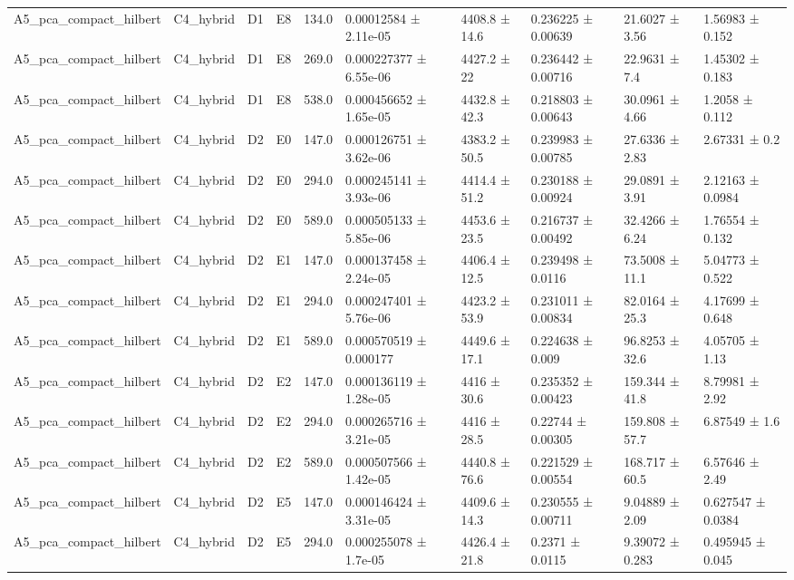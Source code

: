 \begin{table}
\begin{tabular}{llllllllll}
A5\_pca\_compact\_hilbert & C4\_hybrid & D1 & E8 & 134.0 & 0.00012584 ± 2.11e-05 & 4408.8 ± 14.6 & 0.236225 ± 0.00639 & 21.6027 ± 3.56 & 1.56983 ± 0.152 \\
A5\_pca\_compact\_hilbert & C4\_hybrid & D1 & E8 & 269.0 & 0.000227377 ± 6.55e-06 & 4427.2 ± 22 & 0.236442 ± 0.00716 & 22.9631 ± 7.4 & 1.45302 ± 0.183 \\
A5\_pca\_compact\_hilbert & C4\_hybrid & D1 & E8 & 538.0 & 0.000456652 ± 1.65e-05 & 4432.8 ± 42.3 & 0.218803 ± 0.00643 & 30.0961 ± 4.66 & 1.2058 ± 0.112 \\
A5\_pca\_compact\_hilbert & C4\_hybrid & D2 & E0 & 147.0 & 0.000126751 ± 3.62e-06 & 4383.2 ± 50.5 & 0.239983 ± 0.00785 & 27.6336 ± 2.83 & 2.67331 ± 0.2 \\
A5\_pca\_compact\_hilbert & C4\_hybrid & D2 & E0 & 294.0 & 0.000245141 ± 3.93e-06 & 4414.4 ± 51.2 & 0.230188 ± 0.00924 & 29.0891 ± 3.91 & 2.12163 ± 0.0984 \\
A5\_pca\_compact\_hilbert & C4\_hybrid & D2 & E0 & 589.0 & 0.000505133 ± 5.85e-06 & 4453.6 ± 23.5 & 0.216737 ± 0.00492 & 32.4266 ± 6.24 & 1.76554 ± 0.132 \\
A5\_pca\_compact\_hilbert & C4\_hybrid & D2 & E1 & 147.0 & 0.000137458 ± 2.24e-05 & 4406.4 ± 12.5 & 0.239498 ± 0.0116 & 73.5008 ± 11.1 & 5.04773 ± 0.522 \\
A5\_pca\_compact\_hilbert & C4\_hybrid & D2 & E1 & 294.0 & 0.000247401 ± 5.76e-06 & 4423.2 ± 53.9 & 0.231011 ± 0.00834 & 82.0164 ± 25.3 & 4.17699 ± 0.648 \\
A5\_pca\_compact\_hilbert & C4\_hybrid & D2 & E1 & 589.0 & 0.000570519 ± 0.000177 & 4449.6 ± 17.1 & 0.224638 ± 0.009 & 96.8253 ± 32.6 & 4.05705 ± 1.13 \\
A5\_pca\_compact\_hilbert & C4\_hybrid & D2 & E2 & 147.0 & 0.000136119 ± 1.28e-05 & 4416 ± 30.6 & 0.235352 ± 0.00423 & 159.344 ± 41.8 & 8.79981 ± 2.92 \\
A5\_pca\_compact\_hilbert & C4\_hybrid & D2 & E2 & 294.0 & 0.000265716 ± 3.21e-05 & 4416 ± 28.5 & 0.22744 ± 0.00305 & 159.808 ± 57.7 & 6.87549 ± 1.6 \\
A5\_pca\_compact\_hilbert & C4\_hybrid & D2 & E2 & 589.0 & 0.000507566 ± 1.42e-05 & 4440.8 ± 76.6 & 0.221529 ± 0.00554 & 168.717 ± 60.5 & 6.57646 ± 2.49 \\
A5\_pca\_compact\_hilbert & C4\_hybrid & D2 & E5 & 147.0 & 0.000146424 ± 3.31e-05 & 4409.6 ± 14.3 & 0.230555 ± 0.00711 & 9.04889 ± 2.09 & 0.627547 ± 0.0384 \\
A5\_pca\_compact\_hilbert & C4\_hybrid & D2 & E5 & 294.0 & 0.000255078 ± 1.7e-05 & 4426.4 ± 21.8 & 0.2371 ± 0.0115 & 9.39072 ± 0.283 & 0.495945 ± 0.045 \\

\end{tabular}
\end{table}
